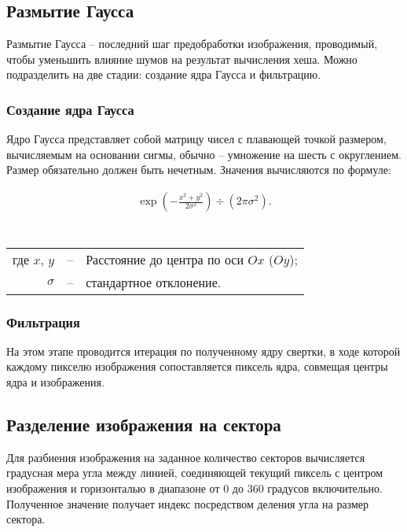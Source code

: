 \subsection{Размытие Гаусса}
Размытие Гаусса -- последний шаг предобработки изображения, проводимый, чтобы
уменьшить влияние шумов на результат вычисления хеша. Можно подразделить на
две стадии: создание ядра Гаусса и фильтрацию.

\subsubsection{Создание ядра Гаусса}

Ядро Гаусса представляет собой матрицу чисел с плавающей точкой размером,
вычисляемым на основании сигмы, обычно -- умножение на шесть с округлением.
Размер обязательно должен быть нечетным. Значения вычисляются по формуле:

\[\begin{array}{c}
            \exp{(-\frac{x^2 + y^2}{2\sigma^2})}\div(2\pi\sigma^2). \\
      \end{array}\]\\
\begin{tabular}{r c l}
      где $x$, $y$ & -- & Расстояние до центра по оси $Ox$ ($Oy$); \\
      \(\sigma\)   & -- & стандартное отклонение.                  \\
\end{tabular}

\subsubsection{Фильтрация}

На этом этапе проводится итерация по полученному ядру свертки, в ходе которой
каждому пикселю изображения сопоставляется пиксель ядра, совмещая центры ядра и
изображения.

\subsection{Разделение изображения на сектора}

Для разбиения изображения на заданное количество секторов вычисляется градусная
мера угла между линией, соединяющей текущий пиксель с центром изображения и
горизонталью в диапазоне от 0 до 360 градусов включительно. Полученное значение
получает индекс посредством деления угла на размер сектора.

